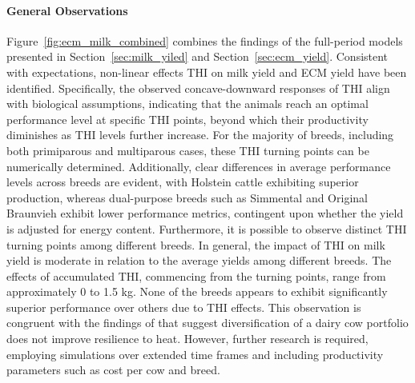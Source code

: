 \paragraph{General Observations} Figure~\ref{fig:ecm_milk_combined} combines the findings of the full-period models presented in Section~\ref{sec:milk_yiled} and Section~\ref{sec:ecm_yield}. Consistent with expectations, non-linear effects THI on milk yield and ECM yield have been identified. Specifically, the observed concave-downward responses of THI align with biological assumptions, indicating that the animals reach an optimal performance level at specific THI points, beyond which their productivity diminishes as THI levels further increase. For the majority of breeds, including both primiparous and multiparous cases, these THI turning points can be numerically determined. Additionally, clear differences in average performance levels across breeds are evident, with Holstein cattle exhibiting superior production, whereas dual-purpose breeds such as Simmental and Original Braunvieh exhibit lower performance metrics, contingent upon whether the yield is adjusted for energy content. Furthermore, it is possible to observe distinct THI turning points among different breeds. In general, the impact of THI on milk yield is moderate in relation to the average yields among different breeds. The effects of accumulated THI, commencing from the turning points, range from approximately 0 to 1.5 kg. None of the breeds appears to exhibit significantly superior performance over others due to THI effects. This observation is congruent with the findings of \cite{ahmed_temperature_2022} that suggest diversification of a dairy cow portfolio does not improve resilience to heat. However, further research is required, employing simulations over extended time frames and including productivity parameters such as cost per cow and breed.

